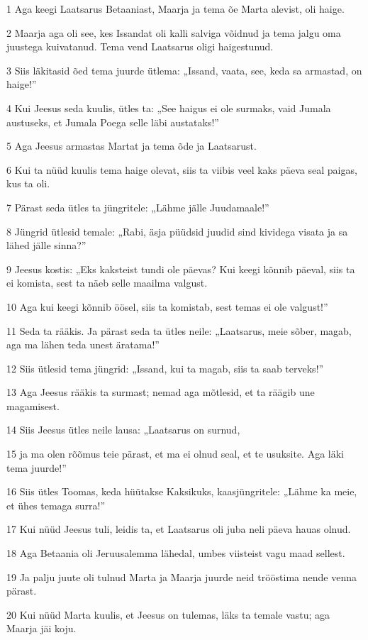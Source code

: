 \par 1 Aga keegi Laatsarus Betaaniast, Maarja ja tema õe Marta alevist, oli haige.
\par 2 Maarja aga oli see, kes Issandat oli kalli salviga võidnud ja tema jalgu oma juustega kuivatanud. Tema vend Laatsarus oligi haigestunud.
\par 3 Siis läkitasid õed tema juurde ütlema: „Issand, vaata, see, keda sa armastad, on haige!”
\par 4 Kui Jeesus seda kuulis, ütles ta: „See haigus ei ole surmaks, vaid Jumala austuseks, et Jumala Poega selle läbi austataks!”
\par 5 Aga Jeesus armastas Martat ja tema õde ja Laatsarust.
\par 6 Kui ta nüüd kuulis tema haige olevat, siis ta viibis veel kaks päeva seal paigas, kus ta oli.
\par 7 Pärast seda ütles ta jüngritele: „Lähme jälle Juudamaale!”
\par 8 Jüngrid ütlesid temale: „Rabi, äsja püüdsid juudid sind kividega visata ja sa lähed jälle sinna?”
\par 9 Jeesus kostis: „Eks kaksteist tundi ole päevas? Kui keegi kõnnib päeval, siis ta ei komista, sest ta näeb selle maailma valgust.
\par 10 Aga kui keegi kõnnib öösel, siis ta komistab, sest temas ei ole valgust!”
\par 11 Seda ta rääkis. Ja pärast seda ta ütles neile: „Laatsarus, meie sõber, magab, aga ma lähen teda unest äratama!”
\par 12 Siis ütlesid tema jüngrid: „Issand, kui ta magab, siis ta saab terveks!”
\par 13 Aga Jeesus rääkis ta surmast; nemad aga mõtlesid, et ta räägib une magamisest.
\par 14 Siis Jeesus ütles neile lausa: „Laatsarus on surnud,
\par 15 ja ma olen rõõmus teie pärast, et ma ei olnud seal, et te usuksite. Aga läki tema juurde!”
\par 16 Siis ütles Toomas, keda hüütakse Kaksikuks, kaasjüngritele: „Lähme ka meie, et ühes temaga surra!”
\par 17 Kui nüüd Jeesus tuli, leidis ta, et Laatsarus oli juba neli päeva hauas olnud.
\par 18 Aga Betaania oli Jeruusalemma lähedal, umbes viisteist vagu maad sellest.
\par 19 Ja palju juute oli tulnud Marta ja Maarja juurde neid trööstima nende venna pärast.
\par 20 Kui nüüd Marta kuulis, et Jeesus on tulemas, läks ta temale vastu; aga Maarja jäi koju.
